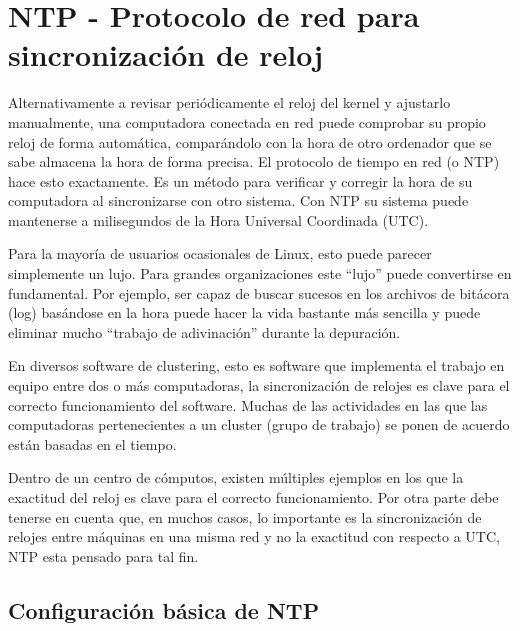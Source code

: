 \documentclass[12pt]{article}
\begin{document}
\section*{NTP - Protocolo de red para sincronización de reloj}

Alternativamente a revisar periódicamente el reloj del kernel y ajustarlo 
manualmente, una computadora conectada en red puede 
comprobar su propio reloj de forma automática, comparándolo con la hora
de otro ordenador que se sabe almacena la hora de forma precisa. El 
protocolo de tiempo en red (o NTP) hace esto exactamente. Es un método para 
verificar y corregir la hora de su computadora al sincronizarse con otro 
sistema. Con NTP su sistema puede mantenerse a milisegundos de la Hora 
Universal Coordinada (UTC). 
	
Para la mayoría de usuarios ocasionales de Linux, esto puede parecer
simplemente un lujo.  Para grandes organizaciones 
este ``lujo'' puede convertirse en fundamental. Por ejemplo, ser capaz de 
buscar sucesos en los archivos de bitácora (log) basándose en la hora puede hacer la vida 
bastante más sencilla y puede eliminar mucho ``trabajo de adivinación'' 
durante la depuración.

En diversos software de clustering, esto es software que implementa el trabajo 
en equipo entre dos o más computadoras, la sincronización de relojes es 
clave para el correcto funcionamiento del software. Muchas de las actividades 
en las que las computadoras pertenecientes a un cluster (grupo de trabajo)
se ponen de acuerdo están basadas en el tiempo.

Dentro de un centro de cómputos, existen múltiples ejemplos en los que la 
exactitud del reloj es clave para el correcto funcionamiento. Por otra parte
debe tenerse en cuenta que, en muchos casos, lo importante es la sincronización de 
relojes entre máquinas en una misma red y no la exactitud con respecto a UTC, NTP 
esta pensado para tal fin.   




\subsection*{Configuración básica de NTP}
\end{document}

